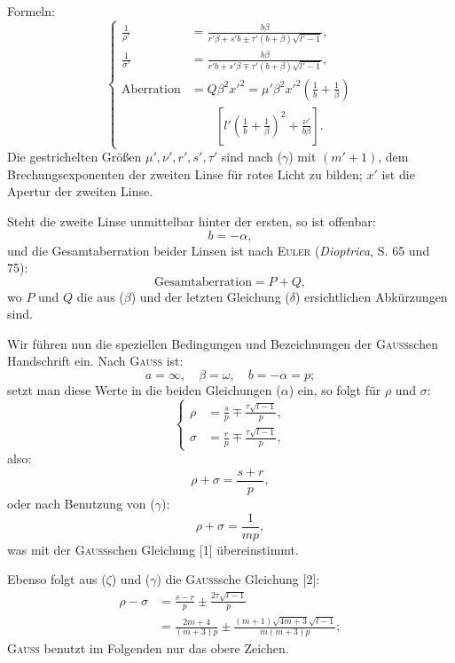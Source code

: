 \noindent Formeln:
\begin{equation*}\tag*{($\delta$)}
\left\{\begin{aligned}
\frac1{\rho'}&=\frac{b\beta}{r'\beta+s'b\pm\tau'(b+\beta)\sqrt{l'-1}},\\[5pt]
\frac1{\sigma'}&=\frac{b\beta}{r'b+s'\beta\mp\tau'(b+\beta)\sqrt{l'-1}},\\[5pt]
\text{Aberration}&=Q\beta^2x'^2=\mu'\beta^2x'^2\left(\frac1b+\frac1\beta\right)\\
&\qquad\left[l'\left(\frac1b+\frac1\beta\right)^2+\frac{\nu'}{b\beta}\right].
\end{aligned}\right.
\end{equation*}
\noindent\hspace*{\parindent}Die gestrichelten Größen $\mu',\nu',r',s',\tau'$ sind nach ($\gamma$) mit $(m'+1)$, dem Brechungsexponenten der zweiten Linse für rotes Licht zu bilden; $x'$ ist die Apertur der zweiten Linse.

Steht die zweite Linse unmittelbar hinter der ersten, so ist offenbar:
\begin{equation*}\tag*{($\varepsilon$)}b=-\alpha,\end{equation*}
\noindent und die Gesamtaberration beider Linsen ist nach \textsc{Euler} (\textit{Dioptrica}, S. 65 und 75):
\[\text{Gesamtaberration}=P+Q,\]
\noindent wo $P$ und $Q$ die aus ($\beta$) und der letzten Gleichung ($\delta$) ersichtlichen Abkürzungen sind.

Wir führen nun die speziellen Bedingungen und Bezeichnungen der \textsc{Gauss}schen Handschrift ein. Nach \textsc{Gauss} ist:
\[a=\infty,\quad\beta=\omega,\quad b=-\alpha=p;\]
\noindent setzt man diese Werte in die beiden Gleichungen ($\alpha$) ein, so folgt für $\rho$ und $\sigma$:
\begin{equation*}\tag*{($\zeta$)}
\left\{\begin{aligned}
\rho&=\frac sp\mp\frac{\tau\sqrt{l-1}}p,\\[4pt]
\sigma&=\frac rp\mp\frac{\tau\sqrt{l-1}}p,
\end{aligned}\right.
\end{equation*}
\noindent also:
\[\rho+\sigma=\frac{s+r}p,\]
\noindent oder nach Benutzung von ($\gamma$):
\begin{equation*}\tag*{($\eta$)}\rho+\sigma=\frac1{mp},\end{equation*}
\noindent was mit der \textsc{Gauss}schen Gleichung [1] übereinstimmt.

Ebenso folgt aus ($\zeta$) und ($\gamma$) die \textsc{Gauss}sche Gleichung [2]:
\begin{equation*}\tag*{($\vartheta$)}
\begin{aligned}
\rho-\sigma&=\frac{s-r}p\pm\frac{2\tau\sqrt{l-1}}p\\
&=\frac{2m+4}{(m+3)p}\pm\frac{(m+1)\sqrt{4m+3}\sqrt{l-1}}{m(m+3)p};
\end{aligned}
\end{equation*}
\noindent \textsc{Gauss} benutzt im Folgenden nur das obere Zeichen.

